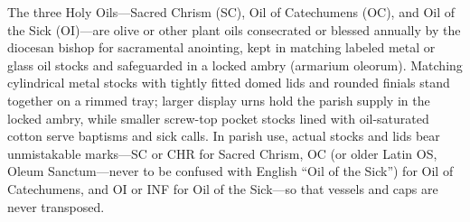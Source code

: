 \label{pc-obj-holy-oils-stocks}
The three Holy Oils---Sacred Chrism (SC), Oil of Catechumens (OC), and Oil of the Sick (OI)---are olive or other plant oils consecrated or blessed annually by the diocesan bishop for sacramental anointing, kept in matching labeled metal or glass oil stocks and safeguarded in a locked ambry (armarium oleorum). Matching cylindrical metal stocks with tightly fitted domed lids and rounded finials stand together on a rimmed tray; larger display urns hold the parish supply in the locked ambry, while smaller screw-top pocket stocks lined with oil-saturated cotton serve baptisms and sick calls. In parish use, actual stocks and lids bear unmistakable marks---SC or CHR for Sacred Chrism, OC (or older Latin OS, Oleum Sanctum---never to be confused with English ``Oil of the Sick'') for Oil of Catechumens, and OI or INF for Oil of the Sick---so that vessels and caps are never transposed.

